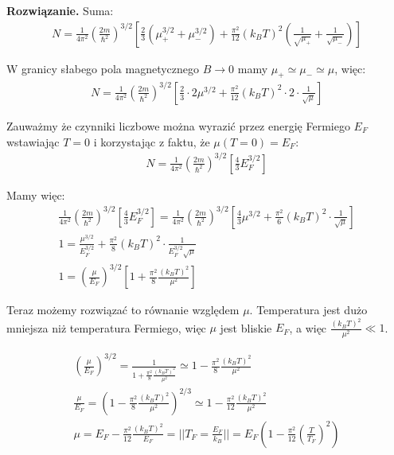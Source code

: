 \documentclass[11pt,a4paper]{article}
\newenvironment{solution}{\vspace{1cm} \par\textbf{Rozwiązanie.} \vspace{1cm}}{}
\begin{document}
\begin{solution}
Suma:
\begin{align*}
N = \frac{1}{4\pi^{2}} \left( \frac{2m}{\hbar^2} \right)^{3/2} \left[
\frac{2}{3} ( \mu_{+}^{3/2} + \mu_{-}^{3/2} ) +
\frac{\pi^2}{12} (k_B T)^2 \left( \frac{1}{\sqrt{\mu_{+}}} + \frac{1}{\sqrt{\mu_{-}}} \right)
\right]
\end{align*}

W granicy słabego pola magnetycznego $B \to 0$ mamy $\mu_{+} \simeq \mu_{-} \simeq \mu$, więc:
\begin{align*}
N = \frac{1}{4\pi^{2}} \left( \frac{2m}{\hbar^2} \right)^{3/2} \left[
\frac{2}{3} \cdot 2 \mu^{3/2} + \frac{\pi^2}{12} (k_B T)^2 \cdot 2 \cdot \frac{1}{\sqrt{\mu}} \right]
\end{align*}

Zauważmy że czynniki liczbowe można wyrazić przez energię Fermiego $E_F$ wstawiając
$T=0$ i korzystając z faktu, że $\mu(T=0) = E_F$:
\begin{align*}
N = \frac{1}{4\pi^{2}} \left( \frac{2m}{\hbar^2} \right)^{3/2} \left[
\frac{4}{3} E_F^{3/2}\right] 
\end{align*}

Mamy więc:
\begin{align*}
\frac{1}{4\pi^{2}} \left( \frac{2m}{\hbar^2} \right)^{3/2} \left[
\frac{4}{3} E_F^{3/2}\right] =
\frac{1}{4\pi^{2}} \left( \frac{2m}{\hbar^2} \right)^{3/2} \left[
\frac{4}{3} \mu^{3/2} + \frac{\pi^2}{6} (k_B T)^2 \cdot \frac{1}{\sqrt{\mu}} \right] \\
1 = \frac{\mu^{3/2}}{E_F^{3/2}} + \frac{\pi^2}{8} (k_B T)^2 \cdot \frac{1}{E_F^{3/2} \sqrt{\mu}} \\
1 = \left( \frac{\mu}{E_F} \right)^{3/2} \left[1 + \frac{\pi^2}{8} \frac{(k_B T)^2}{\mu^2}  \right]
\end{align*}

Teraz możemy rozwiązać to równanie względem $\mu$.
Temperatura jest dużo mniejsza niż temperatura Fermiego, 
więc $\mu$ jest bliskie $E_F$, a więc $\frac{(k_B T)^2}{\mu^2} \ll 1$.

\begin{align*}
\left( \frac{\mu}{E_F} \right)^{3/2} = \frac{1}{1 + \frac{\pi^2}{8} \frac{(k_B T)^2}{\mu^2}} \simeq 
1 - \frac{\pi^2}{8} \frac{(k_B T)^2}{\mu^2} \\
\frac{\mu}{E_F} = \left( 1 - \frac{\pi^2}{8} \frac{(k_B T)^2}{\mu^2} \right)^{2/3} \simeq 
1 - \frac{\pi^2}{12} \frac{(k_B T)^2}{\mu^2} \\
\mu = E_F - \frac{\pi^2}{12} \frac{(k_B T)^2}{E_F} =
|| T_F = \frac{E_F}{k_B} || = 
E_F \left( 1 - \frac{\pi^2}{12} \left( \frac{T}{T_F} \right)^2 \right)
\end{align*}

\newpage
\end{solution}
\end{document}
